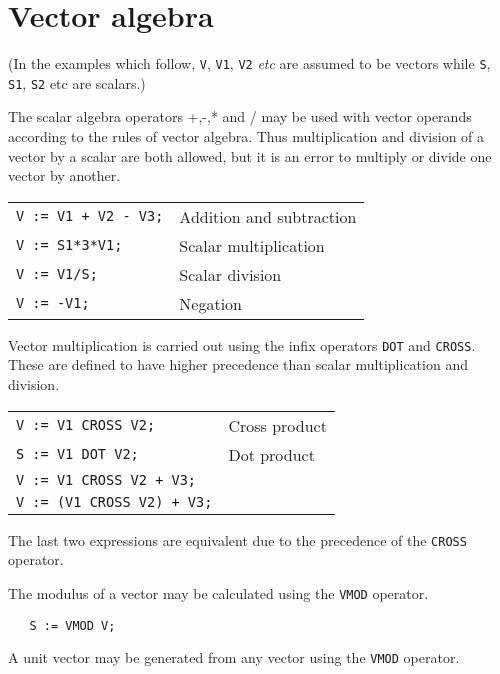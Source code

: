 \section{Vector algebra}

(In the examples which follow, {\tt V}, {\tt V1}, {\tt V2} {\em etc}
are assumed to be vectors while {\tt S}, {\tt S1}, {\tt S2} etc are
scalars.)

The scalar algebra operators +,-,* and / may be used with
vector operands according to the rules of vector algebra.
Thus multiplication and division of a vector by a scalar
are both allowed, but it is an error to multiply or
divide one vector by another.

\begin{tabular}{l l}
{\tt V := V1 + V2 - V3;} & Addition and subtraction \\
{\tt V := S1*3*V1;} & Scalar multiplication \\
{\tt V := V1/S;} & Scalar division \\
{\tt V := -V1;} & Negation \\
\end{tabular}

\noindent Vector multiplication is carried out using the infix
operators {\tt DOT} and {\tt CROSS}.  These are defined to have
higher precedence than scalar multiplication and
division.

\begin{tabular}{l l}
{\tt V := V1 CROSS V2;} & Cross product \\
{\tt S := V1 DOT V2;} & Dot product \\
{\tt V := V1 CROSS V2 + V3;} & \\
{\tt V := (V1 CROSS V2) + V3;} & \\
\end{tabular}

The last two expressions are equivalent due to the precedence of
the {\tt CROSS} operator.

The modulus of a vector may be calculated using the {\tt VMOD} operator.

\begin{verbatim}
   S := VMOD V;
\end{verbatim}

A unit vector may be generated from any vector using the {\tt VMOD}
operator.

